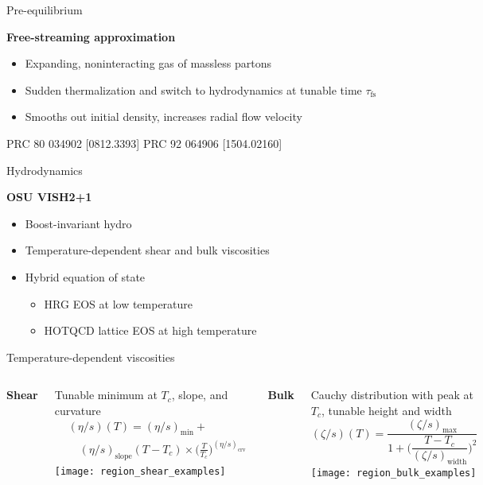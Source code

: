 \documentclass{beamer}
\newcommand{\es}{(\eta/s)}
\newcommand{\zs}{(\zeta/s)}
\begin{document}
\begin{frame}[t]{Pre-equilibrium}
  \begin{center}
    \bf Free-streaming approximation
  \end{center}
  \begin{itemize}
    \setlength{\itemsep}{1ex}
    \item Expanding, noninteracting gas of massless partons
    \item Sudden thermalization and switch to hydrodynamics at tunable time $\tau_\text{fs}$
    \item Smooths out initial density, increases radial flow velocity
  \end{itemize}
  \tiny\flushright PRC 80 034902 [0812.3393] \quad PRC 92 064906 [1504.02160]
\end{frame}

\begin{frame}[t]{Hydrodynamics}
  \begin{center}
    \bf OSU VISH2+1
  \end{center}
  \begin{itemize}
    \setlength{\itemsep}{1ex}
    \item Boost-invariant hydro
    \item Temperature-dependent shear and bulk viscosities
    \item Hybrid equation of state
      \begin{itemize}
        \item HRG EOS at low temperature
        \item HOTQCD lattice EOS at high temperature
      \end{itemize}
  \end{itemize}
\end{frame}

\begin{frame}{Temperature-dependent viscosities}
  \vspace{-1em}
  \begin{columns}[t]
    \begin{center}
      \bf Shear
    \end{center}
    Tunable minimum at $T_c$, slope, and curvature
    \begin{align*}
      &\es(T) = \es_\text{min} + {} \\
      &\quad \es_\text{slope}(T - T_c)
        \times \biggl( \frac{T}{T_c} \biggr)^{\es_\text{crv}}
    \end{align*}
    \texttt{[image: region\_shear\_examples]}
    \begin{center}
      \bf Bulk
    \end{center}
    Cauchy distribution with peak at $T_c$, tunable height and width
    \begin{equation*}
      \zs(T) = \frac{
        \zs_\text{max}
      }{
        1 + \biggl( \dfrac{T - T_c}{\zs_\text{width}} \biggr)^2
      }
    \end{equation*}
    \texttt{[image: region\_bulk\_examples]}
  \end{columns}
\end{frame}
\end{document}
